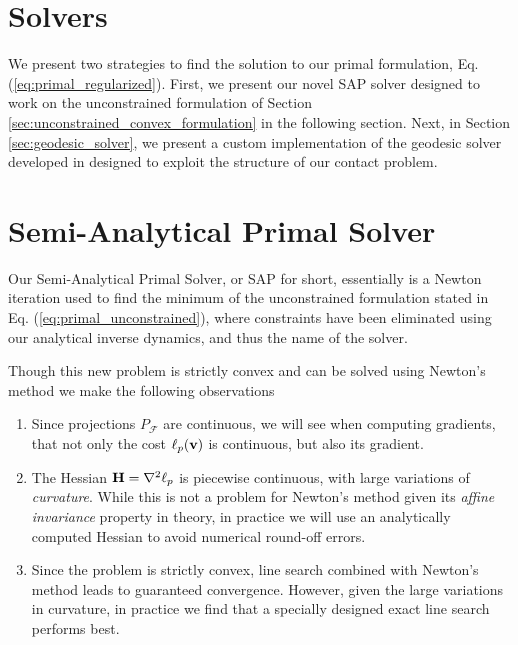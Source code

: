 \section{Solvers}

We present two strategies to find the solution to our primal formulation, Eq.
(\ref{eq:primal_regularized}). First, we present our novel SAP solver designed
to work on the unconstrained formulation of Section
\ref{sec:unconstrained_convex_formulation} in the following section. Next, in
Section \ref{sec:geodesic_solver}, we present a custom implementation of the
geodesic solver developed in \cite{bib:permenter2020} designed to exploit the
structure of our contact problem.


\section{Semi-Analytical Primal Solver}

Our Semi-Analytical Primal Solver, or SAP for short, essentially is a Newton
iteration used to find the minimum of the unconstrained formulation stated in
Eq. (\ref{eq:primal_unconstrained}), where constraints have been eliminated
using our analytical inverse dynamics, and thus the name of the solver.

Though this new problem is strictly convex and can be solved using Newton's method
we make the following observations
\begin{enumerate}
	\item Since projections $P_\mathcal{F}$ are continuous, we will see when
	computing gradients, that not only the cost $\ell_p({\mathbf{v}})$ is continuous,
	but also its gradient.
	\item The Hessian ${\mathbf{H}}=\nabla^2\ell_p$ is piecewise continuous, with
	large variations of \textit{curvature}. While this is not a problem for
	Newton's method given its \textit{affine invariance} property in theory, in
	practice we will use an analytically computed Hessian to avoid numerical
	round-off errors.
	\item\label{item:line_sarch} Since the problem is strictly convex, line
	search combined with Newton's method leads to guaranteed convergence.
	However, given the large variations in curvature, in practice we find that a
	specially designed exact line search performs best.
\end{enumerate}

